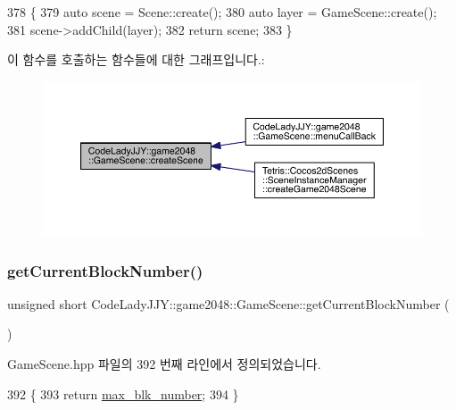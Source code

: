 \begin{DoxyCode}
378                                        \{
379     \textcolor{keyword}{auto} scene = Scene::create();
380     \textcolor{keyword}{auto} layer = GameScene::create();
381     scene->addChild(layer);
382     \textcolor{keywordflow}{return} scene;
383     \}
\end{DoxyCode}
이 함수를 호출하는 함수들에 대한 그래프입니다.\+:
\nopagebreak
\begin{figure}[H]
\begin{center}
\leavevmode
\includegraphics[width=350pt]{d1/d76/class_code_lady_j_j_y_1_1game2048_1_1_game_scene_ab573bac307156883fc8c632821b061e4_icgraph}
\end{center}
\end{figure}
\mbox{\label{class_code_lady_j_j_y_1_1game2048_1_1_game_scene_a102fddfdf3e911218583dbc375786402}} 
\subsubsection{\texorpdfstring{get\+Current\+Block\+Number()}{getCurrentBlockNumber()}}
{\footnotesize\ttfamily unsigned short Code\+Lady\+J\+J\+Y\+::game2048\+::\+Game\+Scene\+::get\+Current\+Block\+Number (\begin{DoxyParamCaption}{ }\end{DoxyParamCaption})\hspace{0.3cm}{\ttfamily [inline]}}



Game\+Scene.\+hpp 파일의 392 번째 라인에서 정의되었습니다.


\begin{DoxyCode}
392                                           \{
393         \textcolor{keywordflow}{return} \hyperlink{class_code_lady_j_j_y_1_1game2048_1_1_game_scene_a8e51807adfe412a0b206f0d35341851e}{max\_blk\_number};
394     \}
\end{DoxyCode}
\mbox{\label{class_code_lady_j_j_y_1_1game2048_1_1_game_scene_a91a4b92af4105f3a0e60b58b96ec0cb5}} 
